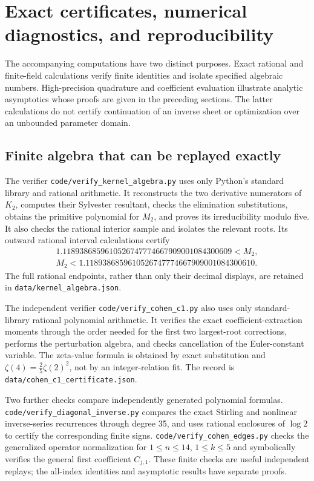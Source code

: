 \section{Exact certificates, numerical diagnostics, and reproducibility}
\label{sec:computation}

The accompanying computations have two distinct purposes. Exact
rational and finite-field calculations verify finite identities and
isolate specified algebraic numbers. High-precision quadrature and
coefficient evaluation illustrate analytic asymptotics whose proofs
are given in the preceding sections. The latter calculations do not
certify continuation of an inverse sheet or optimization over an
unbounded parameter domain.

\subsection{Finite algebra that can be replayed exactly}

The verifier \nolinkurl{code/verify_kernel_algebra.py} uses only Python's
standard library and rational arithmetic. It reconstructs the two
derivative numerators of $K_2$, computes their Sylvester resultant,
checks the elimination substitutions, obtains the primitive polynomial
for $M_2$, and proves its irreducibility modulo five. It also checks
the rational interior sample and isolates the relevant roots. Its
outward rational interval calculations certify
\begin{gather*}
 1.1189386859610526747774667909001084300609
       <M_2,\\
 M_2<1.1189386859610526747774667909001084300610.
\end{gather*}
The full rational endpoints, rather than only their decimal displays,
are retained in \nolinkurl{data/kernel_algebra.json}.

The independent verifier \nolinkurl{code/verify_cohen_c1.py} also uses
only standard-library rational polynomial arithmetic. It verifies the
exact coefficient-extraction moments through the order needed for the
first two largest-root corrections, performs the perturbation algebra,
and checks cancellation of the Euler-constant variable. The zeta-value
formula is obtained by exact substitution and
$\zeta(4)=\tfrac25\zeta(2)^2$, not by an integer-relation fit.
The record is \nolinkurl{data/cohen_c1_certificate.json}.

Two further checks compare independently generated polynomial formulas.
\nolinkurl{code/verify_diagonal_inverse.py} compares the exact Stirling
and nonlinear inverse-series recurrences through degree 35, and uses
rational enclosures of $\log2$ to certify the corresponding finite
signs. \nolinkurl{code/verify_cohen_edges.py} checks the generalized
operator normalization for $1\leq n\leq14$, $1\leq k\leq5$ and
symbolically verifies the general first coefficient $C_{j,1}$.
These finite checks are useful independent replays; the all-index
identities and asymptotic results have separate proofs.

